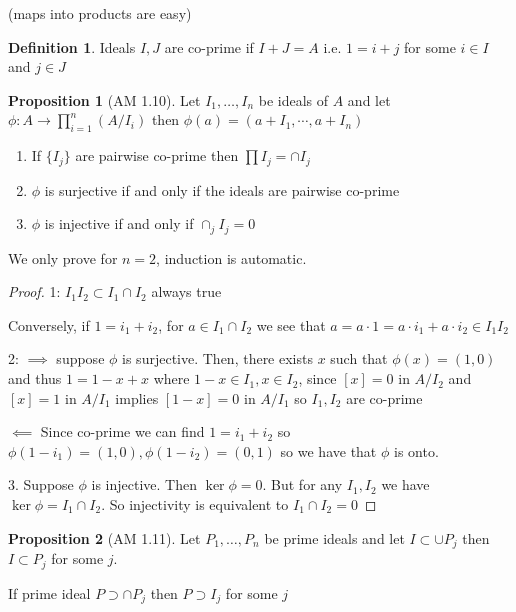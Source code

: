 \documentclass{article}
\theoremstyle{definition}
\newtheorem{definition}{Definition}
\newtheorem{proposition}{Proposition}
\begin{document}
(maps into products are easy)

\begin{definition}
    Ideals \(I,J\) are co-prime if \(I+J=A\) i.e. \(1 = i + j\) for some \(i\in I\) and \(j\in J\) 
\end{definition}

\begin{proposition}
    [AM 1.10] Let \(I_1, \dots, I_n \) be ideals of \(A\) and let \(\phi: A \to \prod_{i=1}^{n} (A / I_i)\) then \(\phi(a)=(a+I_1,\cdots,a+I_n)\) 
    
    \begin{enumerate}
        \item If \(\{ I_j \} \) are pairwise co-prime then \(\prod I_j = \cap I_j\)
        \item \(\phi\) is surjective if and only if the ideals are pairwise co-prime
        \item \(\phi\) is injective if and only if \(\cap_j I_j = 0\)  
    \end{enumerate}

\end{proposition}

We only prove for \(n=2\), induction is automatic.

\begin{proof}
    1: \(I_1 I_2 \subset I_1 \cap I_2\) always true

    Conversely, if \(1 = i_1 + i_2\), for \(a\in I_1\cap I_2\) we see that \(a = a\cdot 1 = a\cdot i_1 + a\cdot i_2\in I_1 I_2\) 

    2: \(\implies \) suppose \(\phi\) is surjective. Then, there exists \(x\) such that \(\phi(x)=(1,0)\) and thus \(1 = 1 - x + x\) where \(1-x\in I_1,x\in I_2\), since \([x]=0\) in \(A / I_2\) and \([x]=1\) in \(A / I_1\) implies \([1 - x]=0\) in \(A / I_1\) so \(I_1,I_2\) are co-prime

    \(\impliedby\) Since co-prime we can find \(1 = i_1 + i_2 \) so \(\phi(1-i_1 )=(1,0),\phi(1-i_2)=(0,1)\) so we have that \(\phi\) is onto.

    3. Suppose \(\phi\) is injective. Then \(\ker\phi = 0\). But for any \(I_1,I_2\) we have \(\ker\phi = I_1\cap I_2\). So injectivity is equivalent to \(I_1\cap I_2 = 0\) 

\end{proof}

\begin{proposition}
    [AM 1.11] Let \(P_1, \dots, P_n \) be prime ideals and let \(I \subset \cup P_j\) then \(I \subset P_j\) for some \(j\).

    If prime ideal \(P \supset \cap P_j\) then \(P \supset I_j\) for some \(j\)  
\end{proposition}
\end{document}
